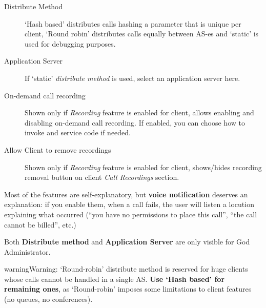\documentclass[letterpaper,10pt,english]{sphinxmanual}
\begin{document}
\begin{description}
\item[{Distribute Method}] \leavevmode{}\label{administration_portal/brand/clients/virtual_pbx:term-distribute-method}
`Hash based' distributes calls hashing a parameter that is unique per
client, `Round robin' distributes calls equally between AS-es and
`static' is used for debugging purposes.

\item[{Application Server}] \leavevmode{}\label{administration_portal/brand/clients/virtual_pbx:term-application-server}
If `static' \emph{distribute method} is used, select an application server here.

\item[{On-demand call recording}] \leavevmode{}\label{administration_portal/brand/clients/virtual_pbx:term-on-demand-call-recording}
Shown only if \emph{Recording} feature is enabled for client, allows enabling and
disabling on-demand call recording. If enabled, you can choose how to invoke
and service code if needed.

\item[{Allow Client to remove recordings}] \leavevmode{}\label{administration_portal/brand/clients/virtual_pbx:term-allow-client-to-remove-recordings}
Shown only if \emph{Recording} feature is enabled for client, shows/hides recording
removal button on client \emph{Call Recordings} section.

\end{description}

Most of the features are self-explanatory, but \textbf{voice notification} deserves
an explanation: if you enable them, when a call fails, the user will listen a
locution explaining what occurred (``you have no permissions to place this call'',
``the call cannot be billed'', etc.)

Both \textbf{Distribute method} and \textbf{Application Server} are only visible for God
Administrator.

\begin{notice}{warning}{Warning:}
`Round-robin' distribute method is reserved for huge clients
whose calls cannot be handled in a single AS. \textbf{Use `Hash based'
for remaining ones}, as `Round-robin' imposes some limitations
to client features (no queues, no conferences).
\end{notice}
\end{document}

